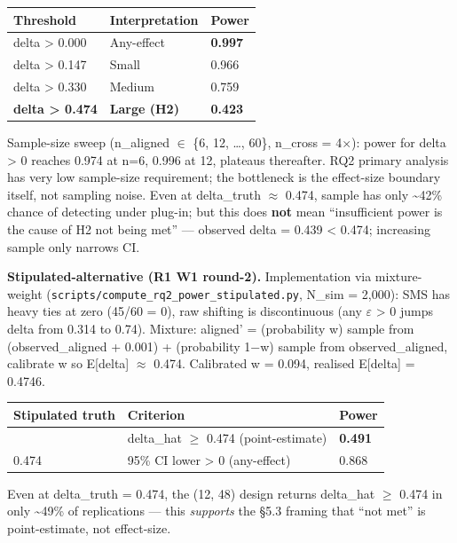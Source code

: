 \documentclass[review,12pt,authoryear]{elsarticle}
\newcounter{none}                   %
\begin{document}
{\def\LTcaptype{none} %
\begin{longtable}[]{@{}lll@{}}
\toprule\noalign{}
Threshold & Interpretation & Power \\
\midrule\noalign{}
\endhead
\bottomrule\noalign{}
\endlastfoot
delta \textgreater{} 0.000 & Any-effect & \textbf{0.997} \\
delta \textgreater{} 0.147 & Small & 0.966 \\
delta \textgreater{} 0.330 & Medium & 0.759 \\
\textbf{delta \textgreater{} 0.474} & \textbf{Large (H2)} &
\textbf{0.423} \\
\end{longtable}
}

Sample-size sweep (n\_aligned $\in$ \{6, 12, \ldots, 60\}, n\_cross = 4$\times$):
power for delta \textgreater{} 0 reaches 0.974 at n=6, 0.996 at 12,
plateaus thereafter. RQ2 primary analysis has very low sample-size
requirement; the bottleneck is the effect-size boundary itself, not
sampling noise. Even at delta\_truth $\approx$ 0.474, sample has only
\textasciitilde42\% chance of detecting under plug-in; but this does
\textbf{not} mean ``insufficient power is the cause of H2 not being
met'' --- observed delta = 0.439 \textless{} 0.474; increasing sample
only narrows CI.

\textbf{Stipulated-alternative (R1 W1 round-2).} Implementation via
mixture-weight (\texttt{scripts/compute\_rq2\_power\_stipulated.py},
N\_sim = 2,000): SMS has heavy ties at zero (45/60 = 0), raw shifting is
discontinuous (any $\varepsilon$ \textgreater{} 0 jumps delta from 0.314 to 0.74).
Mixture: aligned' = (probability w) sample from (observed\_aligned +
0.001) + (probability 1−w) sample from observed\_aligned, calibrate w so
E{[}delta{]} $\approx$ 0.474. Calibrated w = 0.094, realised E{[}delta{]} =
0.4746.

{\def\LTcaptype{none} %
\begin{longtable}[]{@{}lll@{}}
\toprule\noalign{}
Stipulated truth & Criterion & Power \\
\midrule\noalign{}
\endhead
\bottomrule\noalign{}
\endlastfoot
0.474 & delta\_hat $\geq$ 0.474 (point-estimate) & \textbf{0.491} \\
0.474 & 95\% CI lower \textgreater{} 0 (any-effect) & 0.868 \\
\end{longtable}
}

Even at delta\_truth = 0.474, the (12, 48) design returns delta\_hat $\geq$
0.474 in only \textasciitilde49\% of replications --- this
\emph{supports} the §5.3 framing that ``not met'' is point-estimate, not
effect-size.
\end{document}
